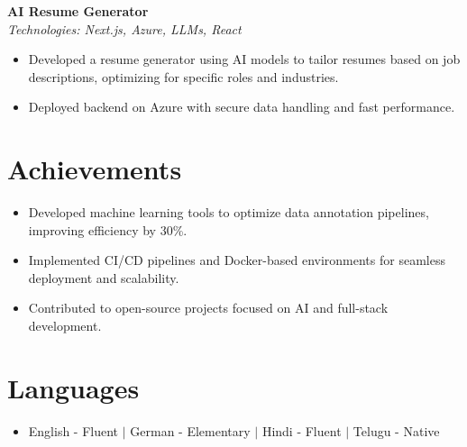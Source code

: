 \documentclass[letterpaper,11pt]{article}
\begin{document}
\textbf{AI Resume Generator} \\
\textit{Technologies: Next.js, Azure, LLMs, React} 
\begin{itemize}
\item Developed a resume generator using AI models to tailor resumes based on job descriptions, optimizing for specific roles and industries.
\item Deployed backend on Azure with secure data handling and fast performance.
\end{itemize}
\vspace{-5pt}

\section{Achievements}
\begin{itemize}
\item Developed machine learning tools to optimize data annotation pipelines, improving efficiency by 30\%.
\item Implemented CI/CD pipelines and Docker-based environments for seamless deployment and scalability.
\item Contributed to open-source projects focused on AI and full-stack development.
\end{itemize}
\vspace{-5pt}

\section{Languages}
\begin{itemize}
  \item English - Fluent $|$ German - Elementary $|$ Hindi - Fluent $|$ Telugu - Native
\end{itemize}
\end{document}
